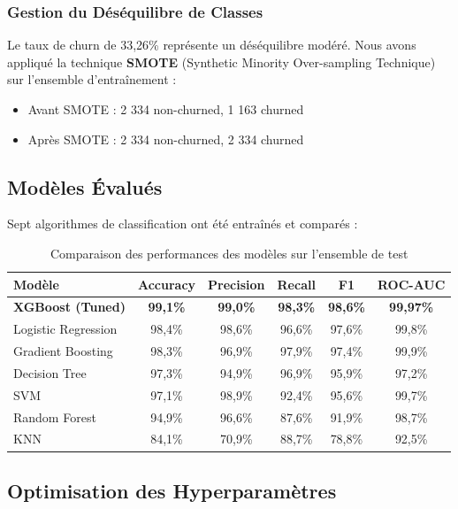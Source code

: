 \documentclass[11pt,a4paper]{article}
\begin{document}
\subsubsection{Gestion du Déséquilibre de Classes}
Le taux de churn de 33,26\% représente un déséquilibre modéré. Nous avons appliqué la technique \textbf{SMOTE} (Synthetic Minority Over-sampling Technique) sur l'ensemble d'entraînement :
\begin{itemize}
    \item Avant SMOTE : 2 334 non-churned, 1 163 churned
    \item Après SMOTE : 2 334 non-churned, 2 334 churned
\end{itemize}

\subsection{Modèles Évalués}

Sept algorithmes de classification ont été entraînés et comparés :

\begin{table}[H]
\centering
\begin{tabular}{lccccc}
\toprule
\textbf{Modèle} & \textbf{Accuracy} & \textbf{Precision} & \textbf{Recall} & \textbf{F1} & \textbf{ROC-AUC} \\
\midrule
\textbf{XGBoost (Tuned)} & \textbf{99,1\%} & \textbf{99,0\%} & \textbf{98,3\%} & \textbf{98,6\%} & \textbf{99,97\%} \\
Logistic Regression & 98,4\% & 98,6\% & 96,6\% & 97,6\% & 99,8\% \\
Gradient Boosting & 98,3\% & 96,9\% & 97,9\% & 97,4\% & 99,9\% \\
Decision Tree & 97,3\% & 94,9\% & 96,9\% & 95,9\% & 97,2\% \\
SVM & 97,1\% & 98,9\% & 92,4\% & 95,6\% & 99,7\% \\
Random Forest & 94,9\% & 96,6\% & 87,6\% & 91,9\% & 98,7\% \\
KNN & 84,1\% & 70,9\% & 88,7\% & 78,8\% & 92,5\% \\
\bottomrule
\end{tabular}
\caption{Comparaison des performances des modèles sur l'ensemble de test}
\end{table}

\subsection{Optimisation des Hyperparamètres}
\end{document}

